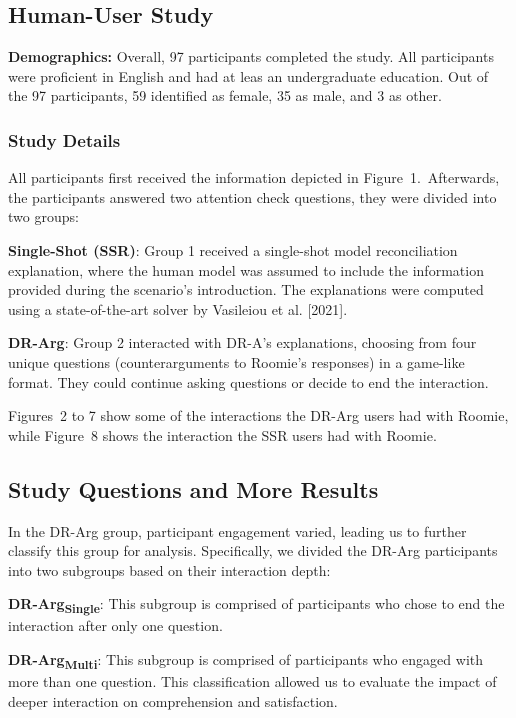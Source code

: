 \documentclass{article}
\begin{document}
\subsection*{Human-User Study}

\noindent \textbf{Demographics:} Overall, 97 participants completed the study. All participants were proficient in English and had at leas an undergraduate education. Out of the 97 participants, 59 identified as female, 35 as male, and 3 as other.

\subsubsection*{Study Details} 

All participants first received the information depicted in Figure~1.~Afterwards, the participants answered two attention check questions, they were divided into two groups:
\squishlist
    \item \textbf{Single-Shot (SSR)}: Group 1 received a single-shot model reconciliation explanation, where the human model was assumed to include the information provided during the scenario's introduction. The explanations were computed using a state-of-the-art solver by Vasileiou et al. [2021].

    \item \textbf{DR-Arg}: Group 2 interacted with DR-A's explanations, choosing from four unique questions (counterarguments to Roomie's responses) in a game-like format. They could continue asking questions or decide to end the interaction.

\squishend



Figures~2 to 7 show some of the interactions the DR-Arg users had with Roomie, while Figure~8 shows the interaction the SSR users had with Roomie.

\subsection*{Study Questions and More Results} 

In the DR-Arg group, participant engagement varied, leading us to further classify this group for analysis. Specifically, we divided the DR-Arg participants into two subgroups based on their interaction depth:
\squishlist
    \item \textbf{DR-Arg\textsubscript{Single}}: This subgroup is comprised of participants who chose to end the interaction after only one question. 
    \item \textbf{DR-Arg\textsubscript{Multi}}: This subgroup is comprised of participants who engaged with more than one question. 
\squishend
This classification allowed us to evaluate the impact of deeper interaction on comprehension and satisfaction.
\end{document}
